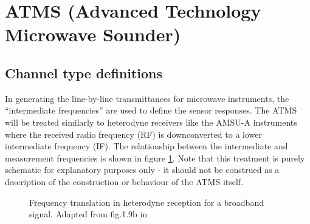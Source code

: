 \section{ATMS (Advanced Technology Microwave Sounder)}

\subsection{Channel type definitions}
In generating the line-by-line transmittances for microwave instruments, the ``intermediate frequencies'' are used to define the sensor responses. The ATMS will be treated similarly to heterodyne receivers like the AMSU-A instruments where the received radio frequency (RF) is downconverted to a lower intermediate frequency (IF). The relationship between the intermediate and measurement frequencies is shown in figure \ref{fig:broadband_frequency_translation}. Note that this treatment is purely schematic for explanatory purposes only - it should not be construed as a description of the construction or behaviour of the ATMS itself.
\begin{figure}[htp]
  \centering
  
  \caption{Frequency translation in heterodyne reception for a broadband signal. Adapted from fig.1.9b in \cite{Janssen1993}}
  \label{fig:broadband_frequency_translation}
\end{figure}

